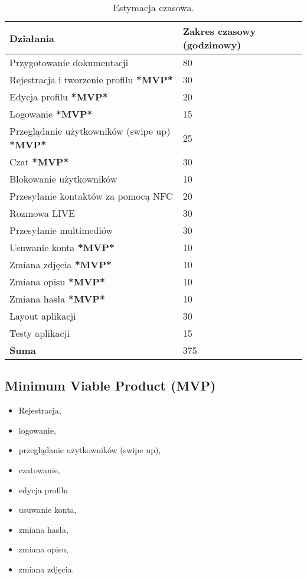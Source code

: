 \documentclass[12pt,a4paper]{article}
\begin{document}
\begin{table} [H]
\centering
\begin{tabular}{ |p{10cm}|p{3.5cm}| } 
\hline
\textbf{Działania} & \textbf{Zakres czasowy (godzinowy)} \\
\hline
Przygotowanie dokumentacji & 80 \\
\hline
Rejestracja i tworzenie profilu \textbf{*MVP*} & 30 \\
\hline
Edycja profilu \textbf{*MVP*} & 20 \\
\hline
Logowanie \textbf{*MVP*} & 15 \\
\hline
Przeglądanie użytkowników (swipe up) \textbf{*MVP*} & 25 \\
\hline
Czat \textbf{*MVP*} & 30 \\
\hline
Blokowanie użytkowników & 10 \\
\hline
Przesyłanie kontaktów za pomocą NFC & 20 \\
\hline
Rozmowa LIVE & 30 \\
\hline
Przesyłanie multimediów & 30 \\
\hline
Usuwanie konta \textbf{*MVP*} & 10 \\
\hline
Zmiana zdjęcia \textbf{*MVP*} & 10 \\
\hline
Zmiana opisu \textbf{*MVP*} & 10 \\
\hline
Zmiana hasła \textbf{*MVP*} & 10 \\
\hline
Layout aplikacji & 30 \\
\hline
Testy aplikacji & 15 \\
\hline
\textbf{Suma} & 375 \\
\hline
\end{tabular}
\caption{Estymacja czasowa.}
\label{table:11}
\end{table}


\subsection{Minimum Viable Product (MVP)}
\begin{itemize} \itemsep0pt
\item Rejestracja,
\item logowanie,
\item przeglądanie użytkowników (swipe up),
\item czatowanie,
\item edycja profilu
\item usuwanie konta,
\item zmiana hasła,
\item zmiana opisu,
\item zmiana zdjęcia.
\end{itemize}
\end{document}
